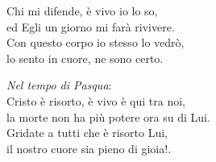 
Chi mi difende, è vivo io lo so,\\
ed Egli un giorno mi farà rivivere.\\
Con questo corpo io stesso lo vedrò,\\
lo sento in cuore, ne sono certo.

\spazio

\emph{Nel tempo di Pasqua}:\\
Cristo è risorto, è vivo è qui tra noi,\\
la morte non ha più potere ora su di Lui.\\
Gridate a tutti che è risorto Lui,\\
il nostro cuore sia pieno di gioia!.
